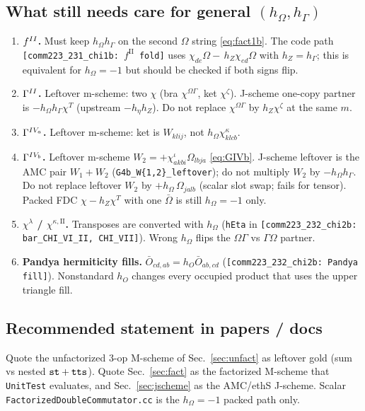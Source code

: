 \documentclass[enabledeprecatedfontcommands]{scrartcl}
\newcommand{\codename}[1]{\texttt{#1}}
\newcommand{\coderef}[1]{\textcolor{codeblue}{\texttt{[#1]}}}
\newcommand{\MyRomanNum}[1]{%
  \ifcase#1\or I\or II\or III\or IV\or V\or VI\or VII\or VIII\or IX\or X\else #1\fi}
\begin{document}
\subsection{What still needs care for general $(h_\Omega,h_\Gamma)$}
\begin{enumerate}
  \item \textbf{$f^{\MyRomanNum{2}}$.}
    Must keep $h_\Omega h_\Gamma$ on the second $\Omega$ string
    \eqref{eq:fact1b}. The code path \coderef{comm223\_231\_chi1b: $f^{\mathrm{II}}$ fold} uses
    $\chi_{de}\Omega-\,h_Z\chi_{ed}\Omega$ with $h_Z=h_\Gamma$; this is
    equivalent for $h_\Omega=-1$ but should be checked if both signs flip.
  \item \textbf{$\Gamma^{\MyRomanNum{2}}$.}
    Leftover m-scheme: two $\chi$ (bra $\chi^{\Omega\Gamma}$, ket $\chi^\zeta$).
    J-scheme one-copy partner is $-h_\Omega h_\Gamma\chi^{T}$ (upstream
    $-h_\eta h_Z$). Do not replace $\chi^{\Omega\Gamma}$ by $h_Z\chi^\zeta$
    at the same $m$.
  \item \textbf{$\Gamma^{\MyRomanNum{4}_a}$.}
    Leftover m-scheme: ket is $W_{klij}$, not $h_\Omega\chi^\kappa_{klcb}$.
  \item \textbf{$\Gamma^{\MyRomanNum{4}_b}$.}
    Leftover m-scheme $W_2=+\chi^\iota_{akbi}\Omega_{lbja}$
    \eqref{eq:GIVb}. J-scheme leftover is the AMC pair
    $W_1+W_2$ (\codename{G4b\_W\{1,2\}\_leftover}); do not multiply $W_2$
    by $-h_\Omega h_\Gamma$. Do not replace leftover $W_2$ by
    $+h_\Omega\,\Omega_{jalb}$ (scalar slot swap; fails for tensor).
    Packed FDC \(\chi-h_Z\chi^{T}\) with one \(\bar\Omega\) is still
    \(h_\Omega=-1\) only.
  \item \textbf{$\chi^\lambda$ / $\chi^{\kappa,\mathrm{II}}$.}
    Transposes are converted with $h_\Omega$
    (\codename{hEta} in \coderef{comm223\_232\_chi2b: bar\_CHI\_VI\_II, CHI\_VII}).
    Wrong $h_\Omega$ flips the $\Omega\Gamma$ vs $\Gamma\Omega$ partner.
  \item \textbf{Pandya hermiticity fills.}
    $\bar O_{cd,ab}=h_O\bar O_{ab,cd}$ (\coderef{comm223\_232\_chi2b: Pandya fill}).
    Nonstandard $h_O$ changes every occupied product that uses the upper
    triangle fill.
\end{enumerate}

\subsection{Recommended statement in papers / docs}
Quote the unfactorized 3-op M-scheme of Sec.~\ref{sec:unfact} as leftover
gold (sum vs nested ${\tt st}+{\tt tts}$).
Quote Sec.~\ref{sec:fact} as the factorized M-scheme that
\codename{UnitTest} evaluates, and Sec.~\ref{sec:jscheme} as the AMC/ethS
J-scheme. Scalar \codename{FactorizedDoubleCommutator.cc} is the
$h_\Omega=-1$ packed path only.
\end{document}
